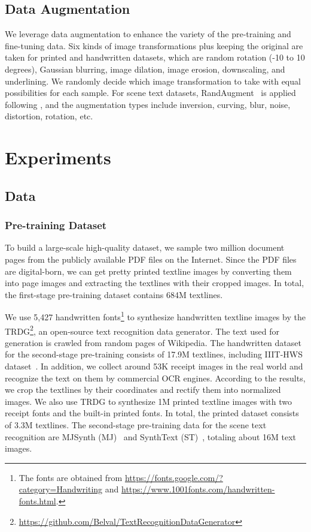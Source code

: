 \documentclass[letterpaper]{article} \usepackage{aaai23}  \usepackage{times}  \usepackage{helvet}  \usepackage{courier}  \usepackage[hyphens]{url}  \usepackage{graphicx} \urlstyle{rm} \def\UrlFont{\rm}  \usepackage{natbib}  \usepackage{caption} \frenchspacing  \setlength{\pdfpagewidth}{8.5in} \setlength{\pdfpageheight}{11in} \usepackage{algorithm}
\begin{document}
\subsection{Data Augmentation}
We leverage data augmentation to enhance the variety of the pre-training and fine-tuning data. Six kinds of image transformations plus keeping the original are taken for printed and handwritten datasets, which are random rotation (-10 to 10 degrees), Gaussian blurring, image dilation, image erosion, downscaling, and underlining. We randomly decide which image transformation to take with equal possibilities for each sample. For scene text datasets, RandAugment~\cite{cubuk2020randaugment} is applied following \cite{atienza2021vision}, and the augmentation types include inversion, curving, blur, noise, distortion, rotation, etc.



\section{Experiments}


\subsection{Data}


\subsubsection{Pre-training Dataset}

To build a large-scale high-quality dataset, we sample two million document pages from the publicly available PDF files on the Internet. Since the PDF files are digital-born, we can get pretty printed textline images by converting them into page images and extracting the textlines with their cropped images.
In total, the first-stage pre-training dataset contains 684M textlines.




We use 5,427 handwritten fonts\footnote{\tiny The fonts are obtained from \url{https://fonts.google.com/?category=Handwriting} and \url{https://www.1001fonts.com/handwritten-fonts.html}.} to synthesize handwritten textline images by the TRDG\footnote{\tiny\url{https://github.com/Belval/TextRecognitionDataGenerator}}, an open-source text recognition data generator. The text used for generation is crawled from random pages of Wikipedia. The handwritten dataset for the second-stage pre-training consists of 17.9M textlines, including IIIT-HWS dataset~\cite{krishnan2016generating}.
In addition, we collect around 53K receipt images in the real world and recognize the text on them by commercial OCR engines. According to the results, we crop the textlines by their coordinates and rectify them into normalized images.
We also use TRDG to synthesize 1M printed textline images with two receipt fonts and the built-in printed fonts. In total, the printed dataset consists of 3.3M textlines.
The second-stage pre-training data for the scene text recognition are MJSynth (MJ)~\cite{synth90ka} and SynthText (ST)~\cite{gupta2016synthetic}, totaling about 16M text images.
\end{document}
